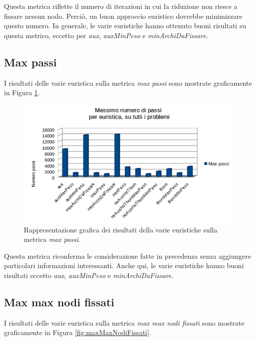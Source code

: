 Questa metrica riflette il numero di iterazioni in cui la riduzione non riesce a fissare nessun nodo. Perciò, un buon approccio euristico dovrebbe minimizzare questo numero. In generale, le varie euristiche hanno ottenuto buoni risultati su questa metrico, eccetto per \textit{aux}, \textit{auxMinPeso} e \textit{minArchiDaFissare}.

\subsection{Max passi}
I risultati delle varie euristica sulla metrica \textit{max passi} sono mostrate graficamente in Figura \ref{fig:maxPassi}.

\begin{figure}[H]
\includegraphics[width=\textwidth]{res/img/maxPassi.png}
\caption{Rappresentazione grafica dei risultati della varie euristiche sulla metrica \textit{max passi}.}
\label{fig:maxPassi}
\end{figure}

Questa metrica riconferma le considerazione fatte in precedenza senza aggiungere particolari informazioni interessanti. Anche qui, le varie euristiche hanno buoni risultati eccetto \textit{aux}, \textit{auxMinPeso} e \textit{minArchiDaFissare}.

\subsection{Max max nodi fissati}
I risultati delle varie euristica sulla metrica \textit{max max nodi fissati} sono mostrate graficamente in Figura \ref{fig:maxMaxNodiFissati}.

